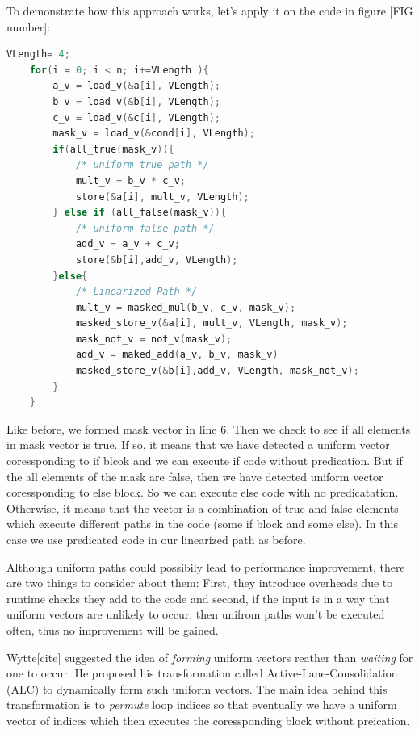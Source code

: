 \documentclass[\main/thesis.tex]{subfiles}
\begin{document}
To demonstrate how this approach works, let's apply it on the code in figure [FIG number]:

\begin{lstlisting}[language=C]
    VLength= 4;
    for(i = 0; i < n; i+=VLength ){
        a_v = load_v(&a[i], VLength);
        b_v = load_v(&b[i], VLength);
        c_v = load_v(&c[i], VLength);
        mask_v = load_v(&cond[i], VLength);
        if(all_true(mask_v)){
            /* uniform true path */
            mult_v = b_v * c_v;
            store(&a[i], mult_v, VLength);
        } else if (all_false(mask_v)){
            /* uniform false path */
            add_v = a_v + c_v;
            store(&b[i],add_v, VLength);
        }else{
            /* Linearized Path */
            mult_v = masked_mul(b_v, c_v, mask_v);
            masked_store_v(&a[i], mult_v, VLength, mask_v);
            mask_not_v = not_v(mask_v);
            add_v = maked_add(a_v, b_v, mask_v)
            masked_store_v(&b[i],add_v, VLength, mask_not_v);
        }
    }
\end{lstlisting}

Like before, we formed mask vector in line 6. Then we check to see if all elements in mask vector is true. If so, it means that we have detected a uniform vector coressponding to if blcok and we can execute if code without predication. But if the all elements of the mask are false, then we have detected 
uniform vector coressponding to else block. So we can execute else code with no predicatation. Otherwise, it means that the vector is a combination of true and false elements which execute different paths in the code (some if block and some else). In this case we use predicated code in our linearized path as before.

Although uniform paths could possibily lead to performance improvement, there are two things to consider about them: First, they introduce overheads due to runtime checks they add to the code and second, if the input is in a way that uniform vectors are unlikely to occur, then unifrom paths
won't be executed often, thus no improvement will be gained.

Wytte[cite] suggested the idea of \emph{forming} uniform vectors reather than \emph{waiting} for one to occur. He proposed his transformation called Active-Lane-Consolidation (ALC) to dynamically form such uniform vectors. The main idea behind this transformation is to \emph{permute} loop indices
so that eventually we have a uniform vector of indices which then executes the coressponding block without preication. 
\end{document}
